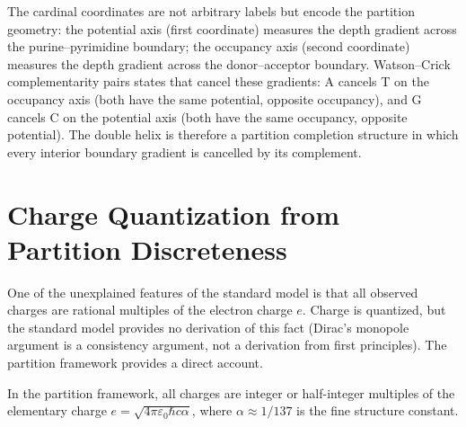 \begin{remark}
The cardinal coordinates are not arbitrary labels but encode the partition
geometry: the potential axis (first coordinate) measures the depth gradient
across the purine--pyrimidine boundary; the occupancy axis (second coordinate)
measures the depth gradient across the donor--acceptor boundary. Watson--Crick
complementarity pairs states that cancel these gradients: A cancels T on the
occupancy axis (both have the same potential, opposite occupancy), and G cancels
C on the potential axis (both have the same occupancy, opposite potential).
The double helix is therefore a partition completion structure in which
every interior boundary gradient is cancelled by its complement.
\end{remark}

\section{Charge Quantization from Partition Discreteness}
\label{sec:charge_quantization}

One of the unexplained features of the standard model is that all observed
charges are rational multiples of the electron charge $e$. Charge is quantized,
but the standard model provides no derivation of this fact (Dirac's monopole
argument is a consistency argument, not a derivation from first principles).
The partition framework provides a direct account.

\begin{theorem}
\label{thm:charge_quantization}
In the partition framework, all charges are integer or half-integer multiples
of the elementary charge $e = \sqrt{4\pi\varepsilon_0 \hbar c \alpha}$, where
$\alpha \approx 1/137$ is the fine structure constant.
\end{theorem}

